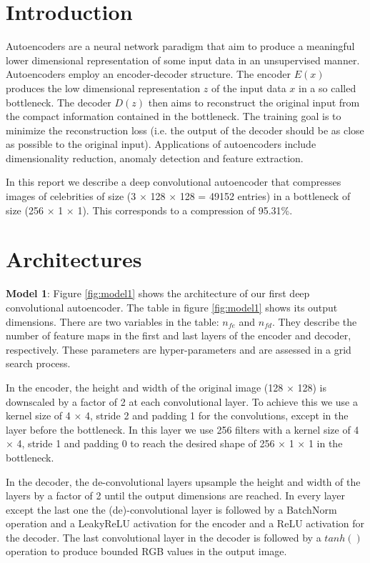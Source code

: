 \documentclass{article}
\begin{document}
\begin{multicols}{2}

\section{Introduction}

Autoencoders are a neural network paradigm that aim to produce a meaningful lower dimensional representation of some input data in an unsupervised manner. Autoencoders employ an encoder-decoder structure. The encoder $E(x)$ produces the low dimensional representation $z$ of the input data $x$ in a so called bottleneck. The decoder $D(z)$ then aims to reconstruct the original input from the compact information contained in the bottleneck. The training goal is to minimize the reconstruction loss (i.e. the output of the decoder should be as close as possible to the original input). Applications of autoencoders include dimensionality reduction, anomaly detection and feature extraction. 

In this report we describe a deep convolutional autoencoder that compresses images of celebrities of size (3 $\times$ 128 $\times$ 128 = 49152 entries) in a bottleneck of size (256 $\times$ 1 $\times$ 1). This corresponds to a compression of 95.31\%.

\section{Architectures}
\textbf{Model 1}: Figure \ref{fig:model1} shows the architecture of our first deep convolutional autoencoder. The table in figure \ref{fig:model1} shows its output dimensions. There are two variables in the table: $n_{fe}$ and $n_{fd}$. They describe the number of feature maps in the first and last layers of the encoder and decoder, respectively. These parameters are hyper-parameters and are assessed in a grid search process. 

In the encoder, the height and width of the original image (128 $\times$ 128) is downscaled by a factor of 2 at each convolutional layer. To achieve this we use a kernel size of 4 $\times$ 4, stride 2 and padding 1 for the convolutions, except in the layer before the bottleneck. In this layer we use 256 filters with a kernel size of 4 $\times$ 4, stride 1 and padding 0 to reach the desired shape of 256 $\times$ 1 $\times$ 1 in the bottleneck. 

In the decoder, the de-convolutional layers upsample the height and width of the layers by a factor of 2 until the output dimensions are reached. In every layer except the last one the (de)-convolutional layer is followed by a BatchNorm operation and a LeakyReLU activation for the encoder and a ReLU activation for the decoder. The last convolutional layer in the decoder is followed by a $tanh()$ operation to produce bounded RGB values in the output image.


\end{multicols}
\end{document}
